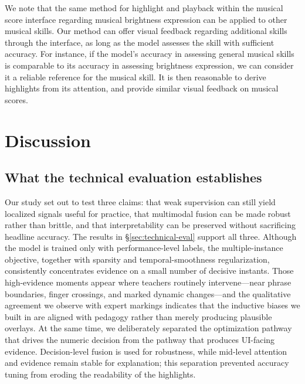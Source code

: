 \documentclass[sigconf,review,anonymous]{acmart}
\begin{document}
{%
We note that the same method for highlight and playback within the musical score interface regarding musical brightness expression can be applied to other musical skills. 
Our method can offer visual feedback regarding additional skills through the interface, as long as the model assesses the skill with sufficient accuracy. 
For instance, if the model's accuracy in assessing general musical skills is comparable to its accuracy in assessing brightness expression, we can consider it a reliable reference for the musical skill.
It is then reasonable to derive highlights from its attention, and provide similar visual feedback on musical scores.
}

\section{Discussion}

\subsection{What the technical evaluation establishes}
Our study set out to test three claims: that weak supervision can still yield localized signals useful for practice, that multimodal fusion can be made robust rather than brittle, and that interpretability can be preserved without sacrificing headline accuracy. The results in \S\ref{sec:technical-eval} support all three. Although the model is trained only with performance-level labels, the multiple-instance objective, together with sparsity and temporal-smoothness regularization, consistently concentrates evidence on a small number of decisive instants. Those high-evidence moments appear where teachers routinely intervene—near phrase boundaries, finger crossings, and marked dynamic changes—and the qualitative agreement we observe with expert markings indicates that the inductive biases we built in are aligned with pedagogy rather than merely producing plausible overlays. At the same time, we deliberately separated the optimization pathway that drives the numeric decision from the pathway that produces UI-facing evidence. Decision-level fusion is used for robustness, while mid-level attention and evidence remain stable for explanation; this separation prevented accuracy tuning from eroding the readability of the highlights.
\end{document}
